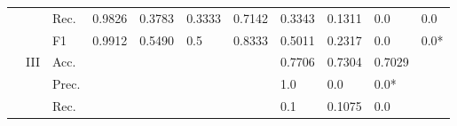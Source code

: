 \begin{tabular}{cclllllllll}
    \multicolumn{1}{l}{}                                                                                       &                                   & Rec.                                                 & 0.9826                  & 0.3783                  & 0.3333                       & 0.7142                  & 0.3343                                                                       & 0.1311                                                                      & 0.0                                       & 0.0                                       \\
    \multicolumn{1}{l}{}                                                                                       &                                   & F1                                                   & 0.9912                  & 0.5490                  & 0.5                          & 0.8333                  & 0.5011                                                                       & 0.2317                                                                      & 0.0                                       & 0.0*                                      \\ 
    \cmidrule{2-11}
    \multicolumn{1}{l}{}                                                                                       & \multirow{4}{*}{III}              & Acc.                                                 &                         &                         &                              &                         & 0.7706                                                                       & 0.7304                                                                      & 0.7029                                    &                                           \\
    \multicolumn{1}{l}{}                                                                                       &                                   & Prec.                                                &                         &                         &                              &                         & 1.0                                                                          & 0.0                                                                         & 0.0*                                      &                                           \\
    \multicolumn{1}{l}{}                                                                                       &                                   & Rec.                                                 &                         &                         &                              &                         & 0.1                                                                          & 0.1075                                                                      & 0.0                                       &                                           \\

\end{tabular}

